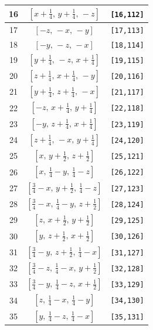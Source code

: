 \documentclass[fleqn,8pt]{jsarticle}
\begin{document}
\begin{longtable}{ccc}
16 & $\left[ x + \frac{1}{4},\, y + \frac{1}{4},\, - z \right]$ & {\tt [16,112]} \\ \hline
17 & $\left[ - z,\, - x,\, - y \right]$ & {\tt [17,113]} \\ \hline
18 & $\left[ - y,\, - z,\, - x \right]$ & {\tt [18,114]} \\ \hline
19 & $\left[ y + \frac{1}{4},\, - z,\, x + \frac{1}{4} \right]$ & {\tt [19,115]} \\ \hline
20 & $\left[ z + \frac{1}{4},\, x + \frac{1}{4},\, - y \right]$ & {\tt [20,116]} \\ \hline
21 & $\left[ y + \frac{1}{4},\, z + \frac{1}{4},\, - x \right]$ & {\tt [21,117]} \\ \hline
22 & $\left[ - z,\, x + \frac{1}{4},\, y + \frac{1}{4} \right]$ & {\tt [22,118]} \\ \hline
23 & $\left[ - y,\, z + \frac{1}{4},\, x + \frac{1}{4} \right]$ & {\tt [23,119]} \\ \hline
24 & $\left[ z + \frac{1}{4},\, - x,\, y + \frac{1}{4} \right]$ & {\tt [24,120]} \\ \hline
25 & $\left[ x,\, y + \frac{1}{2},\, z + \frac{1}{2} \right]$ & {\tt [25,121]} \\ \hline
26 & $\left[ x,\, \frac{1}{4} - y,\, \frac{1}{4} - z \right]$ & {\tt [26,122]} \\ \hline
27 & $\left[ \frac{3}{4} - x,\, y + \frac{1}{2},\, \frac{1}{4} - z \right]$ & {\tt [27,123]} \\ \hline
28 & $\left[ \frac{3}{4} - x,\, \frac{1}{4} - y,\, z + \frac{1}{2} \right]$ & {\tt [28,124]} \\ \hline
29 & $\left[ z,\, x + \frac{1}{2},\, y + \frac{1}{2} \right]$ & {\tt [29,125]} \\ \hline
30 & $\left[ y,\, z + \frac{1}{2},\, x + \frac{1}{2} \right]$ & {\tt [30,126]} \\ \hline
31 & $\left[ \frac{3}{4} - y,\, z + \frac{1}{2},\, \frac{1}{4} - x \right]$ & {\tt [31,127]} \\ \hline
32 & $\left[ \frac{3}{4} - z,\, \frac{1}{4} - x,\, y + \frac{1}{2} \right]$ & {\tt [32,128]} \\ \hline
33 & $\left[ \frac{3}{4} - y,\, \frac{1}{4} - z,\, x + \frac{1}{2} \right]$ & {\tt [33,129]} \\ \hline
34 & $\left[ z,\, \frac{1}{4} - x,\, \frac{1}{4} - y \right]$ & {\tt [34,130]} \\ \hline
35 & $\left[ y,\, \frac{1}{4} - z,\, \frac{1}{4} - x \right]$ & {\tt [35,131]} \\ \hline

\end{longtable}
\end{document}
